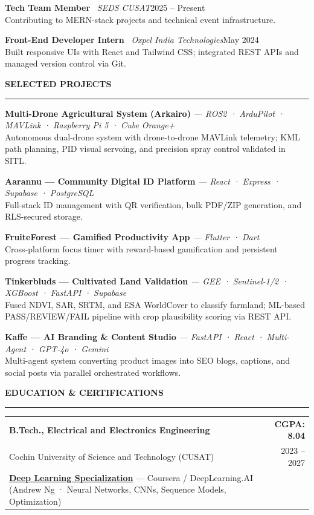 \documentclass[9.5pt, a4paper]{article}
\newcommand{\cvsection}[1]{%
  \vspace{4pt}%
  {\color{accent}\textbf{\MakeUppercase{#1}}}\\[-5pt]
  {\color{rulecol}\rule{\linewidth}{0.5pt}}%
  \vspace{1pt}%
}
\newcommand{\entry}[4]{%
  \textbf{#1} \textbar\ \textit{#2}\hfill{\small\color{subtle}#3}\\
  {\small #4}%
}
\newcommand{\project}[3]{%
  \textbf{#1} {\small\color{subtle}\textit{— #2}}\\
  {\small #3}%
}
\begin{document}
\vspace{3pt}
\entry{Tech Team Member}{SEDS CUSAT}{2025 – Present}%
      {Contributing to MERN-stack projects and technical event infrastructure.}

\vspace{3pt}
\entry{Front-End Developer Intern}{Oxpel India Technologies}{May 2024}%
      {Built responsive UIs with React and Tailwind CSS; integrated REST APIs and managed version control via Git.}

\cvsection{Selected Projects}

\project{Multi-Drone Agricultural System (Arkairo)}{ROS2 · ArduPilot · MAVLink · Raspberry Pi 5 · Cube Orange+}%
        {Autonomous dual-drone system with drone-to-drone MAVLink telemetry; KML path planning, PID visual servoing, and precision spray control validated in SITL.}
        
\vspace{3pt}
\project{Aarannu — Community Digital ID Platform}{React · Express · Supabase · PostgreSQL}%
        {Full-stack ID management with QR verification, bulk PDF/ZIP generation, and RLS-secured storage.}

\vspace{3pt}
\project{FruiteForest — Gamified Productivity App}{Flutter · Dart}%
        {Cross-platform focus timer with reward-based gamification and persistent progress tracking.}

\vspace{3pt}
\project{Tinkerbluds — Cultivated Land Validation}{GEE · Sentinel-1/2 · XGBoost · FastAPI · Supabase}%
        {Fused NDVI, SAR, SRTM, and ESA WorldCover to classify farmland; ML-based PASS/REVIEW/FAIL pipeline with crop plausibility scoring via REST API.}

\vspace{3pt}
\project{Kaffe — AI Branding \& Content Studio}{FastAPI · React · Multi-Agent · GPT-4o · Gemini}%
        {Multi-agent system converting product images into SEO blogs, captions, and social posts via parallel orchestrated workflows.}


\cvsection{Education \& Certifications}
\begin{tabularx}{\linewidth}{@{} X r @{}}
  \small\textbf{B.Tech., Electrical and Electronics Engineering} & \small\textbf{CGPA: 8.04} \\
  \small Cochin University of Science and Technology (CUSAT) & \small 2023 – 2027 \\[3pt]
  \small\href{https://coursera.org/share/be953313c178bdf0ee8309b2a82b541a}{\textbf{Deep Learning Specialization}} — Coursera / DeepLearning.AI \small{\color{subtle}(Andrew Ng · Neural Networks, CNNs, Sequence Models, Optimization)} & \\
\end{tabularx}
\end{document}
